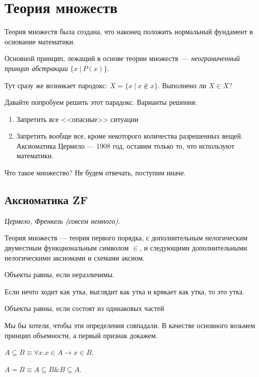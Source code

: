 \section{Теория множеств}
Теория множеств была создана, что наконец положить нормальный фундамент в основание математики.

Основной принцип, лежащий в основе теории множеств~---
\textit{неограниченный принцип абстракции} $\{ x\ |\ P(x)\}$.

Тут сразу же возникает пародокс:
$X = \{ x\ |\ x \notin x \}$. Выполнено ли $X \in X$?

Давайте попробуем решить этот парадокс. Варианты решения:
\begin{enumerate}
\item Запретить все <<опасные>> ситуации
\item Запретить вообще все, кроме некоторого количества разрешенных вещей. Аксиоматика Цермело --- 1908 год, оставим только то, что используют математики.
\end{enumerate}
Что такое множество? Не будем отвечать, поступим иначе.

\subsection{Аксиоматика ZF}
\textit{Цермело, Френкель (совсем немного).}

\begin{definition}
   Теория множеств --- теория первого порядка,
с дополнительным нелогическим двуместным функциональным  символом $\in$, и следующими дополнительными нелогическими аксиомами и схемами аксиом.
\end{definition}

\begin{definition}
    Объекты равны, если неразличимы.
\end{definition}

Если нечто ходит как утка, выглядит как утка и крякает как утка, то это утка.
\begin{definition}
   Объекты равны, если состоят из одинаковых частей
\end{definition}

Мы бы хотели, чтобы эти определения совпадали. В качестве основного возьмем принцип объемности, а первый признак докажем.

\begin{definition}
   $A \subseteq B \equiv \forall x.x \in A \rightarrow x \in B$.

   $A = B \equiv A \subseteq B \& B \subseteq A$.
\end{definition}
